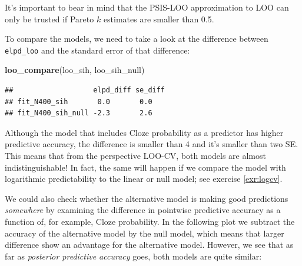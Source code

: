 \documentclass[12pt,]{krantz}
\newenvironment{Shaded}{\begin{snugshade}}{\end{snugshade}}
\newcommand{\KeywordTok}[1]{\textcolor[rgb]{0.13,0.29,0.53}{\textbf{#1}}}
\newcommand{\DataTypeTok}[1]{\textcolor[rgb]{0.13,0.29,0.53}{#1}}
\newcommand{\DecValTok}[1]{\textcolor[rgb]{0.00,0.00,0.81}{#1}}
\newcommand{\FloatTok}[1]{\textcolor[rgb]{0.00,0.00,0.81}{#1}}
\newcommand{\StringTok}[1]{\textcolor[rgb]{0.31,0.60,0.02}{#1}}
\newcommand{\OperatorTok}[1]{\textcolor[rgb]{0.81,0.36,0.00}{\textbf{#1}}}
\newcommand{\NormalTok}[1]{#1}
\theoremstyle{definition}
\theoremstyle{definition}
\theoremstyle{definition}
\theoremstyle{remark}
\begin{document}
It's important to bear in mind that the PSIS-LOO approximation to LOO
can only be trusted if Pareto \(k\) estimates are smaller than 0.5.

To compare the models, we need to take a look at the difference between
\texttt{elpd\_loo} and the standard error of that difference:

\begin{Shaded}
\begin{Highlighting}[]
\KeywordTok{loo_compare}\NormalTok{(loo_sih, loo_sih_null)}
\end{Highlighting}
\end{Shaded}

\begin{verbatim}
##                   elpd_diff se_diff
## fit_N400_sih       0.0       0.0   
## fit_N400_sih_null -2.3       2.6
\end{verbatim}

Although the model that includes Cloze probability as a predictor has
higher predictive accuracy, the difference is smaller than 4 and it's
smaller than two SE. This means that from the perspective LOO-CV, both
models are almost indistinguishable! In fact, the same will happen if we
compare the model with logarithmic predictability to the linear or null
model; see exercise \ref{exr:logcv}.

We could also check whether the alternative model is making good
predictions \emph{somewhere} by examining the difference in pointwise
predictive accuracy as a function of, for example, Cloze probability. In
the following plot we subtract the accuracy of the alternative model by
the null model, which means that larger difference show an advantage for
the alternative model. However, we see that as far as \emph{posterior
predictive accuracy} goes, both models are quite similar:

\begin{Shaded}
\end{Shaded}
\end{document}
